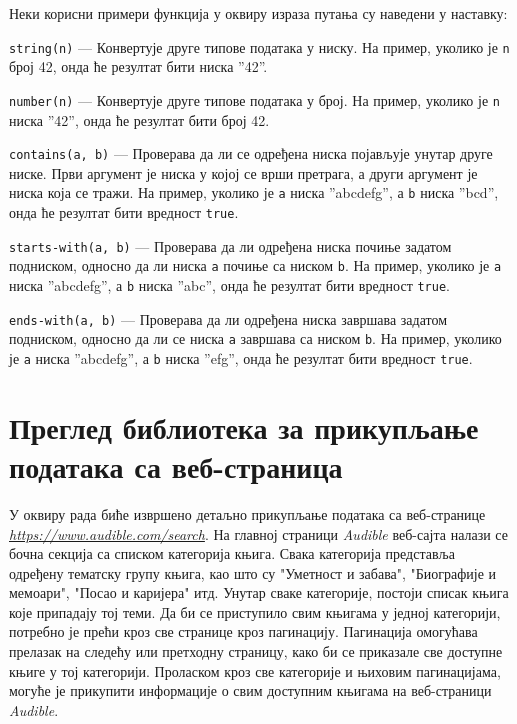 \documentclass[12pt,oneside]{memoir}
\begin{document}
Неки корисни примери функција у оквиру израза путања су наведени у наставку:
\begin{description}
\item \texttt{string(n)} --- Конвертује друге типове података у ниску. На пример, уколико је \texttt{n} број 42, онда ће резултат бити ниска ''42''.
\item \texttt{number(n)} --- Конвертује друге типове података у број. На пример, уколико је \texttt{n} ниска ''42'', онда ће резултат бити број 42.
\item \texttt{contains(a, b)} --- Проверава да ли се одређена ниска појављује унутар друге ниске. Први аргумент је ниска у којој се врши претрага, а други аргумент је ниска која се тражи. На пример, уколико је \texttt{a} ниска ''abcdefg'', а \texttt{b} ниска ''bcd'', онда ће резултат бити вредност \texttt{true}.
\item \texttt{starts-with(a, b)} --- Проверава да ли одређена ниска почиње задатом подниском, односно да ли ниска \texttt{a} почиње са ниском \texttt{b}.
На пример, уколико је \texttt{a} ниска ''abcdefg'', а \texttt{b} ниска ''abc'', онда ће резултат бити вредност \texttt{true}.
\item \texttt{ends-with(a, b)} --- Проверава да ли одређена ниска завршава задатом подниском, односно да ли се ниска \texttt{a} завршава са ниском \texttt{b}.
На пример, уколико је \texttt{a} ниска ''abcdefg'', а \texttt{b} ниска ''efg'', онда ће резултат бити вредност \texttt{true}.
\end{description}
\chapter[Преглед библиотека за прикупљање података]{Преглед библиотека за прикупљање података са веб-страница}

\label{chp:alati}
У оквиру рада биће извршено детаљно прикупљање података са веб-странице \textit{\href{https://www.audible.com/search}{https://www.audible.com/search}}. На главној страници \textit{Audible} веб-сајта налази се бочна секција са списком категорија књига. Свака категорија представља одређену тематску групу књига, као што су "Уметност и забава", "Биографије и мемоари", "Посао и каријера" итд. Унутар сваке категорије, постоји списак књига које припадају тој теми. Да би се приступило свим књигама у једној категорији, потребно је прећи кроз све странице кроз пагинацију. Пагинација омогућава прелазак на следећу или претходну страницу, како би се приказале све доступне књиге у тој категорији. Проласком кроз све категорије и њиховим пагинацијама, могуће је прикупити информације о свим доступним књигама на  веб-страници \textit{Audible}.
\end{document}
